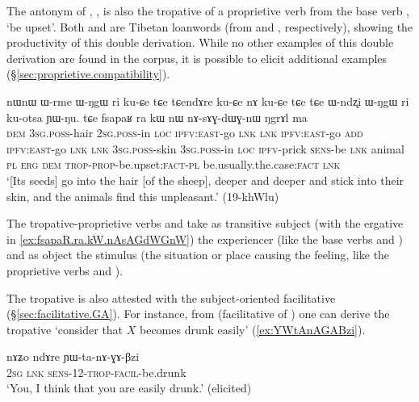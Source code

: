 The antonym of  , , is also the tropative of a proprietive verb  from the base verb , `be upset'. Both  and  are Tibetan loanwords (from  and , respectively), showing the productivity of this double derivation. While no other examples of this double derivation are found in the corpus, it is possible to elicit additional examples (§\ref{sec:proprietive.compatibility}).

\begin{exe}
\ex \label{ex:fsapaR.ra.kW.nAsAGdWGnW}
\gll nɯnɯ ɯ-rme ɯ-ŋgɯ ri ku-ɕe tɕe tɕendɤre ku-ɕe nɤ ku-ɕe tɕe tɕe ɯ-ndʐi ɯ-ŋgɯ ri ku-otsa ɲɯ-ŋu. tɕe fsapaʁ ra kɯ nɯ nɤ-sɤɣ-dɯɣ-nɯ ŋgrɤl ma \\
\textsc{dem} \textsc{3sg}.\textsc{poss}-hair \textsc{2sg}.\textsc{poss}-in \textsc{loc} \textsc{ipfv}:\textsc{east}-go \textsc{lnk} \textsc{lnk} \textsc{ipfv}:\textsc{east}-go \textsc{add} \textsc{ipfv}:\textsc{east}-go \textsc{lnk} \textsc{lnk} \textsc{3sg}.\textsc{poss}-skin \textsc{3sg}.\textsc{poss}-in \textsc{loc} \textsc{ipfv}-prick \textsc{sens}-be \textsc{lnk} animal \textsc{pl} \textsc{erg} \textsc{dem} \textsc{trop}-\textsc{prop}-be.upset:\textsc{fact}-\textsc{pl} be.usually.the.case:\textsc{fact} \textsc{lnk} \\
\glt `[Its seeds] go into the hair [of the sheep], deeper and deeper and stick into their skin, and the animals find this unpleasant.' (19-khWlu)
\end{exe}

The tropative-proprietive verbs  and  take as transitive subject (with the ergative in \ref{ex:fsapaR.ra.kW.nAsAGdWGnW}) the experiencer (like the base verbs  and ) and as object the stimulus (the situation or place causing the feeling, like the proprietive verbs  and ).

The tropative is also attested with the subject-oriented facilitative  (§\ref{sec:facilitative.GA}). For instance, from  (facilitative of ) one can derive the tropative  `consider that $X$ becomes drunk easily' (\ref{ex:YWtAnAGABzi}).

\begin{exe}
\ex \label{ex:YWtAnAGABzi}
\gll nɤʑo ndɤre ɲɯ-ta-nɤ-ɣɤ-βzi  \\
\textsc{2sg} \textsc{lnk} \textsc{sens}-1\fl{}2-\textsc{trop}-\textsc{facil}-be.drunk \\
\glt `You, I think that you are easily drunk.' (elicited)
\end{exe}

